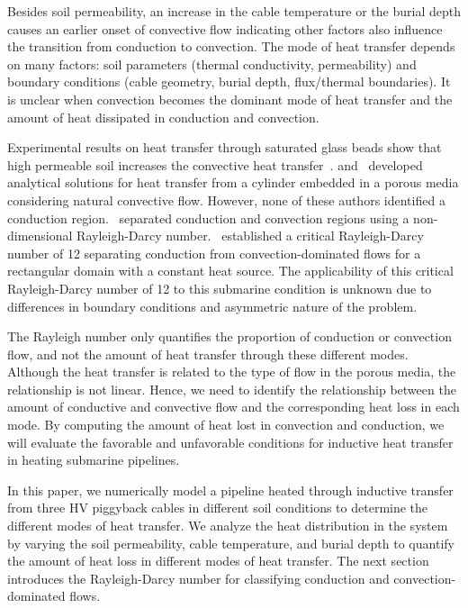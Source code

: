 \documentclass[Journal,letterpaper,InsideFigs]{ascelike-new}
\begin{document}
Besides soil permeability, an increase in the cable temperature or the burial depth causes an earlier onset of convective flow indicating other factors also influence the transition from conduction to convection. The mode of heat transfer depends on many factors: soil parameters (thermal conductivity, permeability) and boundary conditions (cable geometry, burial depth, flux/thermal boundaries). It is unclear when convection becomes the dominant mode of heat transfer and the amount of heat dissipated in conduction and convection. 

Experimental results on heat transfer through saturated glass beads show that high permeable soil increases the convective heat transfer~\cite{fand1986natural}.  and~ developed analytical solutions for heat transfer from a cylinder embedded in a porous media considering natural convective flow. However, none of these authors identified a conduction region.~  separated conduction and convection regions using a non-dimensional Rayleigh-Darcy number.~ established a critical Rayleigh-Darcy number of 12 separating conduction from convection-dominated flows for a rectangular domain with a constant heat source. The applicability of this critical Rayleigh-Darcy number of 12 to this submarine condition is unknown due to differences in boundary conditions and asymmetric nature of the problem. 

The Rayleigh number only quantifies the proportion of conduction or convection flow, and not the amount of heat transfer through these different modes. Although the heat transfer is related to the type of flow in the porous media, the relationship is not linear. Hence, we need to identify the relationship between the amount of conductive and convective flow and the corresponding heat loss in each mode. By computing the amount of heat lost in convection and conduction, we will evaluate the favorable and unfavorable conditions for inductive heat transfer in heating submarine pipelines.

In this paper, we numerically model a pipeline heated through inductive transfer from three HV piggyback cables in different soil conditions to determine the different modes of heat transfer. We analyze the heat distribution in the system by varying the soil permeability, cable temperature, and burial depth to quantify the amount of heat loss in different modes of heat transfer. The next section introduces the Rayleigh-Darcy number for classifying conduction and convection-dominated flows. 
\end{document}
